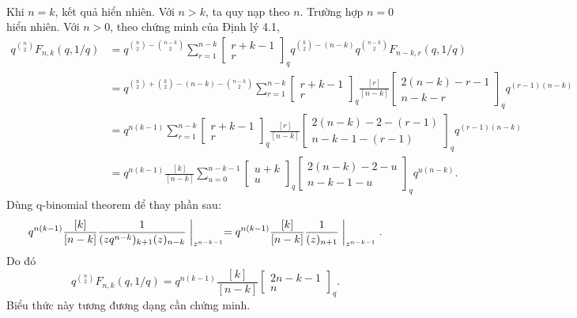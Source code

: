 \documentclass[11pt]{article}
\begin{document}
\paragraph{}
Khi \(n=k\), kết quả hiển nhiên. Với \(n>k\), ta quy nạp theo \(n\). Trường hợp
\(n=0\) hiển nhiên. Với \(n>0\), theo chứng minh của Định lý 4.1,
\[
\begin{aligned}
  q^{\binom{n}{2}}F_{n,k}(q,1/q)
  &=
  q^{\binom{n}{2}-\binom{n-k}{2}}
  \sum_{r=1}^{n-k}
  \left[\begin{matrix}r+k-1\\ r\end{matrix}\right]_q
  q^{\binom{k}{2}-(n-k)}
  q^{\binom{n-k}{2}}F_{n-k,r}(q,1/q) \\
  &=
  q^{\binom{n}{2}+\binom{k}{2}-(n-k)-\binom{n-k}{2}}
  \sum_{r=1}^{n-k}
  \left[\begin{matrix}r+k-1\\ r\end{matrix}\right]_q
  \frac{[r]}{[n-k]}
  \left[\begin{matrix}2(n-k)-r-1\\ n-k-r\end{matrix}\right]_q
  q^{(r-1)(n-k)} \\
  &=
  q^{n(k-1)}
  \sum_{r=1}^{n-k}
  \left[\begin{matrix}r+k-1\\ r\end{matrix}\right]_q
  \frac{[r]}{[n-k]}
  \left[\begin{matrix}2(n-k)-2-(r-1)\\ n-k-1-(r-1)\end{matrix}\right]_q
  q^{(r-1)(n-k)} \\
  &=
  q^{n(k-1)}
  \frac{[k]}{[n-k]}
  \sum_{u=0}^{n-k-1}
  \left[\begin{matrix}u+k\\ u\end{matrix}\right]_q
  \left[\begin{matrix}2(n-k)-2-u\\ n-k-1-u\end{matrix}\right]_q
  q^{u(n-k)}.
\end{aligned}
\]
Dùng q-binomial theorem để thay phần sau:
\[
  q^{n(k-1)}
  \frac{[k]}{[n-k]}
  \frac{1}{(zq^{n-k})_{k+1}(z)_{n-k}}\biggm|_{z^{n-k-1}}
  =
  q^{n(k-1)}
  \frac{[k]}{[n-k]}
  \frac{1}{(z)_{n+1}}\biggm|_{z^{n-k-1}}.
\]
Do đó
\[
  q^{\binom{n}{2}}F_{n,k}(q,1/q)
  =
  q^{n(k-1)}
  \frac{[k]}{[n-k]}
  \left[\begin{matrix}2n-k-1\\ n\end{matrix}\right]_q.
\]
Biểu thức này tương đương dạng cần chứng minh.
\end{document}
